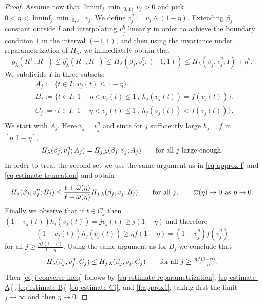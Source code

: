 \documentclass[a4paper,reqno]{amsart}
\theoremstyle{remark}
\newcommand{\ol}{\overline}
\numberwithin{equation}{section}
\begin{document}
\begin{proof}
Assume now that $\liminf_j \min_{[0,1]}v_j>0$ and pick $0<\eta<\liminf_j \min_{[0,1]}v_j$. We define
$v_j^\eta:=v_j\wedge (1-\eta)$. Extending $\beta_j$ constant outside $I$ and interpolating $v_j^\eta$ linearly in order to achieve the boundary condition $1$ in the interval $(-1,1)$, and then using the invariance under reparametrization of $H_{\lambda}$, we immediately obtain that
	\begin{equation}\label{eq-estimate-reparametrization}
		g_{\lambda}(R^+,R^-)\leq
				g^*_{\lambda}(R^+,R^-)\leq
				H_{\lambda} (\beta_j,v^\eta_j;(-1,1))\leq  H_{\lambda} (\beta_j,v^\eta_j;I)+ \eta^2.
	\end{equation}
	We subdivide $I$ in three subsets:
	\begin{equation}
		\label{eq-subsets}
		\begin{split}
			&A_j:=\{t\in I:\ v_j(t)\leq 1-\eta\},\\
			&B_j:=\{t\in I:\ 1-\eta<v_j(t)\leq 1\,,\ h_j(v_j(t))=f(v_j(t))\},\\
			&C_j:=\{t\in I:\ 1-\eta<v_j(t)\leq 1\,,\ h_j(v_j(t))<f(v_j(t))\}.\\
		\end{split}
	\end{equation}
We start with $A_j$. Here $v_j=v_j^\eta$ and since for $j$ sufficiently large $h_j=f$ in $[\eta,1-\eta]$, \begin{equation}
	\label{eq-estimate-Aj}
	H_{\lambda}(\beta_j,v_j^\eta;A_j)=H_{j,\lambda}(\beta_j,v_j;A_j)\qquad \hbox{for all $j$ large enough}.
\end{equation}
In order to treat the second set we use the same argument as in \eqref{eq-approx-f} and \eqref{eq-estimate-truncation} and obtain
\begin{equation}
	\label{eq-estimate-Bj}
H_{\lambda}(\beta_j,v_j^\eta;B_j)\leq \frac{\ell+\ol \omega(\eta)}{\ell-\ol \omega(\eta)}H_{j,\lambda}(\beta_j,v_j;B_j)\qquad \hbox{for all $j$}, \qquad \ol\omega(\eta) \to 0\ \text{as}\ \eta \to 0.
\end{equation}
Finally we observe that if $t\in C_j$ then $(1-v_j(t))h_j(v_j(t))= jv_j(t)\geq j(1-\eta)$ and therefore
\begin{equation*}
(1-v_j(t))h_j(v_j(t))\geq \eta f(1-\eta)=(1-v_j^\eta)f(v_j^\eta)
\end{equation*}
for all $j\geq \frac {\eta f(1-\eta)}{1-\eta}$. Using the same argument as for $B_j$ we conclude that
\begin{equation}
	\label{eq-estimate-Cj}
H_{\lambda}(\beta_j,v_j^\eta;C_j)\leq
H_{j,\lambda}(\beta_j,v_j;C_j)\qquad \hbox{for all $j\geq \frac {\eta f(1-\eta)}{1-\eta}$}.
\end{equation}
Then \eqref{eq-j-converse-ineq} follows by  \eqref{eq-estimate-reparametrization}, \eqref{eq-estimate-Aj}, \eqref{eq-estimate-Bj} \eqref{eq-estimate-Cj}, and \eqref{f:approx1}, taking first the limit $j\to\infty$ and then $\eta\to0$.
\end{proof}
\end{document}
